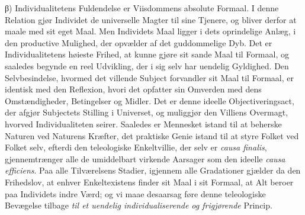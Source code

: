 \documentclass[12pt]{book}
\newcommand{\opage}[1]{\marginnote{\footnotesize\textit{[#1]}}}
\begin{document}
\opage{243} β) Individualitetens Fuldendelse er Viisdommens absolute Formaal. I denne Relation
gjør Individet de universelle Magter til sine Tjenere, og bliver derfor at maale med
sit eget Maal. Men Individets Maal ligger i dets oprindelige Anlæg, i den productive
Mulighed, der opvælder af det guddommelige Dyb. Det er Individualitetens høieste
Frihed, at kunne gjøre sit sande Maal til Formaal, og saaledes begynde en reel
Udvikling, der i sig selv har uendelig Gyldighed. Den Selvbesindelse, hvormed det
villende Subject forvandler sit Maal til Formaal, er identisk med den Reflexion, hvori
det opfatter sin Omverden med dens Omstændigheder, Betingelser og Midler. Det er denne
ideelle Objectiveringsact, der afgjør Subjectets Stilling i Universet, og muliggjør
den Villiens Overmagt, hvorved Individualiteten seirer. Saaledes er Mennesket istand
til at beherske Naturen ved Naturens Kræfter, det praktiske Genie istand til at styre
Folket ved Folket selv, efterdi den teleologiske Enkeltvillie, der selv er
\textit{causa finalis}, gjennemtrænger alle de umiddelbart virkende Aarsager som den
ideelle \textit{causa efficiens}. Paa alle Tilværelsens Stadier, igjennem alle
Gradationer gjælder da den Frihedslov, at enhver Enkeltexistens finder sit Maal i sit
Formaal, at Alt beroer paa Individets indre Værd; og vi maae desaarsag føre denne
teleologiske Bevægelse tilbage \emph{til et uendelig individualiserende og frigjørende}
Princip.
\end{document}
